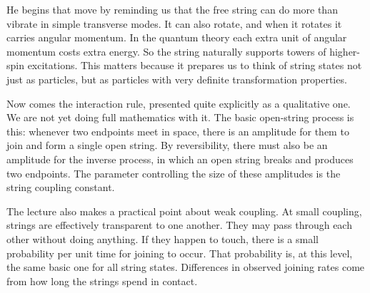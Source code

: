 He begins that move by reminding us that the free string can do more than vibrate in simple transverse modes. It can also rotate, and when it rotates it carries angular momentum. In the quantum theory each extra unit of angular momentum costs extra energy. So the string naturally supports towers of higher-spin excitations. This matters because it prepares us to think of string states not just as particles, but as particles with very definite transformation properties.

Now comes the interaction rule, presented quite explicitly as a qualitative one. We are not yet doing full mathematics with it. The basic open-string process is this: whenever two endpoints meet in space, there is an amplitude for them to join and form a single open string. By reversibility, there must also be an amplitude for the inverse process, in which an open string breaks and produces two endpoints. The parameter controlling the size of these amplitudes is the string coupling constant.

The lecture also makes a practical point about weak coupling. At small coupling, strings are effectively transparent to one another. They may pass through each other without doing anything. If they happen to touch, there is a small probability per unit time for joining to occur. That probability is, at this level, the same basic one for all string states. Differences in observed joining rates come from how long the strings spend in contact.

